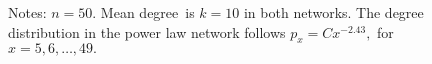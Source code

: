\documentclass[12pt]{article}
\begin{document}
\begin{figure}[t!]
\begin{footnotesize}
\begin{center}
\end{center}

%

\vspace{-0.2cm}%
{}Notes: $n=50.$ Mean degree\ is $k=10$ in both networks. The degree
distribution in the power law network follows $p_{x}=Cx^{-2.43},$ for
$x=5,6,\ldots,49.$%

\end{footnotesize}%
%

\end{figure}%
%
\end{document}

